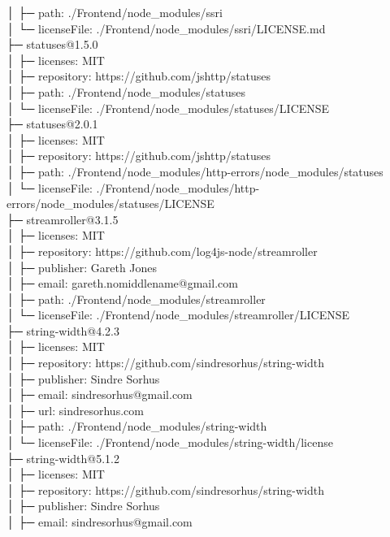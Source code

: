 │  ├─ path: ./Frontend/node\_modules/ssri\\
│  └─ licenseFile: ./Frontend/node\_modules/ssri/LICENSE.md\\
├─ statuses@1.5.0\\
│  ├─ licenses: MIT\\
│  ├─ repository: https://github.com/jshttp/statuses\\
│  ├─ path: ./Frontend/node\_modules/statuses\\
│  └─ licenseFile: ./Frontend/node\_modules/statuses/LICENSE\\
├─ statuses@2.0.1\\
│  ├─ licenses: MIT\\
│  ├─ repository: https://github.com/jshttp/statuses\\
│  ├─ path: ./Frontend/node\_modules/http-errors/node\_modules/statuses\\
│  └─ licenseFile: ./Frontend/node\_modules/http-errors/node\_modules/statuses/LICENSE\\
├─ streamroller@3.1.5\\
│  ├─ licenses: MIT\\
│  ├─ repository: https://github.com/log4js-node/streamroller\\
│  ├─ publisher: Gareth Jones\\
│  ├─ email: gareth.nomiddlename@gmail.com\\
│  ├─ path: ./Frontend/node\_modules/streamroller\\
│  └─ licenseFile: ./Frontend/node\_modules/streamroller/LICENSE\\
├─ string-width@4.2.3\\
│  ├─ licenses: MIT\\
│  ├─ repository: https://github.com/sindresorhus/string-width\\
│  ├─ publisher: Sindre Sorhus\\
│  ├─ email: sindresorhus@gmail.com\\
│  ├─ url: sindresorhus.com\\
│  ├─ path: ./Frontend/node\_modules/string-width\\
│  └─ licenseFile: ./Frontend/node\_modules/string-width/license\\
├─ string-width@5.1.2\\
│  ├─ licenses: MIT\\
│  ├─ repository: https://github.com/sindresorhus/string-width\\
│  ├─ publisher: Sindre Sorhus\\
│  ├─ email: sindresorhus@gmail.com\\
